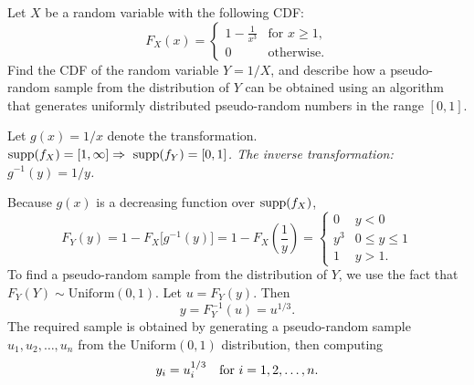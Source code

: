 \begin{exercise}
\begin{questions}
\question
Let $X$ be a random variable with the following CDF:
\[
F_X(x) = \left\{\begin{array}{ll}
	\displaystyle 1-\frac{1}{x^3}		& \text{for $x\geq 1$,} \\
	0								& \text{otherwise.}
\end{array}\right.
\]
Find the CDF of the random variable $Y=1/X$, and describe how a pseudo-random sample from the distribution of $Y$ can be obtained using an algorithm that generates uniformly distributed pseudo-random numbers in the range $[0,1]$.
\begin{answer}
Let $g(x) = 1/x$ denote the transformation. 
\bit
\it $\text{supp}(f_X) = [1,\infty] \Rightarrow\ \text{supp}(f_Y) = [0,1]$.
\it The inverse transformation: $g^{-1}(y) = 1/y$.
\eit
\par
Because $g(x)$ is a decreasing function over $\text{supp}(f_X)$,
\[
F_Y(y) 
	= 1 - F_X\big[g^{-1}(y)\big]
	= 1 - F_X\left(\frac{1}{y}\right)
	= \left\{\begin{array}{ll}
		0	& y < 0 \\
		y^3	& 0\leq y\leq 1 \\
		1	& y > 1.
	\end{array}\right.
\]
To find a pseudo-random sample from the distribution of $Y$, we use the fact that
$F_Y(Y)\sim\text{Uniform}(0,1)$. Let $u=F_Y(y)$. Then 
\[
y = F_Y^{-1}(u) = u^{1/3}.
\]
The required sample is obtained by generating a pseudo-random sample $u_1,u_2,\ldots,u_n$ from the $\text{Uniform}(0,1)$ distribution, then computing
\[
y_i = u_i^{1/3} \text{\quad for $i=1,2,\ldots,n$.}
\]
\end{answer}

\end{questions}
\end{exercise}

\endinput
